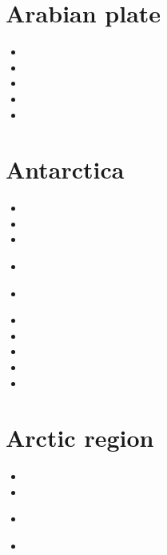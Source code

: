 \section{Arabian plate}

\begin{small}
\begin{itemize}
\item[\twothousandthirteen] 
\item[\twothousandfifteen] 
\item[\twothousandeighteen] 
\item[\twothousandtwenty] 
\item[\twothousandtwentytwo] 
\end{itemize}
\end{small}

\section{Antarctica}

\begin{small}
\begin{itemize}
\item[\nineteenninetyeight]
\item[\twothousandseven]
\item[\twothousandten]
\item[\twothousandtwelve]
 \\ 
\item[\twothousandthirteen]
 \\
\item[\twothousandfifteen]
\item[\twothousandeighteen]
\item[\twothousandtwentyone]
\item[\twothousandtwentythree]
\item[2024]
\end{itemize}
\end{small}

\section{Arctic region}

\begin{small}
\begin{itemize}
\item[2021]
\item[2023]
\item[2024] 
\\
\item[2026] 
\end{itemize}
\end{small}

